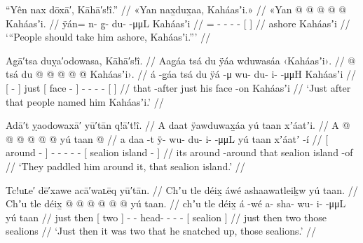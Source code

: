 \ex\label{ex:93-59-take-him-ashore}%
%
\begingl
	\glpreamble	“Yên nax dōxā′, Kāhā′s!î.” //
	\glpreamble	«\!Yan nax̱dux̱aa, Kaháasʼi.\!» //
	\gla	«\!Yan @  @ {} @ {} @ {} @ {}
		{} Kaháasʼi. {} //
	\glb	\pqp{}ÿán= n- g̱- du-  -μμL
		{} Kaháasʼi {} //
	\glc	\pqp{}= - - -  -
		{}[  {}] //
	\gld	\pqp{}ashore  {} {} {} {}
		{} Kaháasʼi {} //
	\glft	‘“People should take him ashore, Kaháasʼi.”’
		//
\endgl
\xe

\ex\label{ex:93-60-named-him}%
%
\begingl
	\glpreamble	Ag̣ā′tsa duỵa′odowasa, Kāhā′s!î. //
	\glpreamble	Aag̱áa tsá du ÿáa wduwasáa ‹\!Kaháasʼi\!›. //
	\gla	{}  @ {} {} tsá
		{} du  @ {} {}
		 @ {} @ {} @ {} @ {}
		{} Kaháasʼi\!›. {} //
	\glb	{} á -g̱áa {} tsá
		{} du ÿá -μ {}
		wu- du- i-  -μμH
		{} Kaháasʼi {} //
	\glc	{}[  - {}] just
		{}[  face - {}]
		- - -  -
		{}[  {}] //
	\gld	{} that -after {} just
		{} his face -on {}
		 {} {} {} {}
		{} Kaháasʼi {} //
	\glft	‘Just after that people named him Kaháasʼi.’
		//
\endgl
\xe

\ex\label{ex:93-61-paddled-him-around}%
%
\begingl
	\glpreamble	Adā′t ỵaodowaxā′ yū′tān q!ā′t!î. //
	\glpreamble	A daat ÿawduwax̱áa yú taan xʼáatʼi. //
	\gla	{} A  @ {} {}
		 @ {} @ {} @ {} @ {} @ {}
		{} yú taan  @ {} {} //
	\glb	{} a daa -t {}
		ÿ- wu- du- i-  -μμL
		{} yú taan xʼáatʼ -í {} //
	\glc	{}[  around - {}]
		- - - -  -
		{}[  sealion island - {}] //
	\gld	{} its around -around {}
		 {} {} {} {} {}
		{} that sealion island -of {} //
	\glft	‘They paddled him around it, that sealion island.’
		//
\endgl
\xe

\ex\label{ex:93-62-snatch-up-two}%
%
\begingl
	\glpreamble	Tc!uʟe′ dē′xawe acā′waʟēq yū′tān. //
	\glpreamble	Chʼu tle déix̱ áwé ashaawatleiḵw yú taan. //
	\gla	Chʼu tle {} déix̱ {}
		 @ {}
		 @ {} @ {} @ {} @ {} @ {}
		{} yú taan. {} //
	\glb	chʼu tle {} déix̱ {}
		á -wé
		a- sha- wu- i-  -μμL
		{} yú taan {} //
	\glc	just then {}[ two {}]
		 -
		- head- - -  -
		{}[  sealion {}] //
	\gld	just then {} two {}
		 {}
		 {} {} {} {} {}
		{} those sealions {} //
	\glft	‘Just then it was two that he snatched up, those sealions.’
		//
\endgl
\xe

